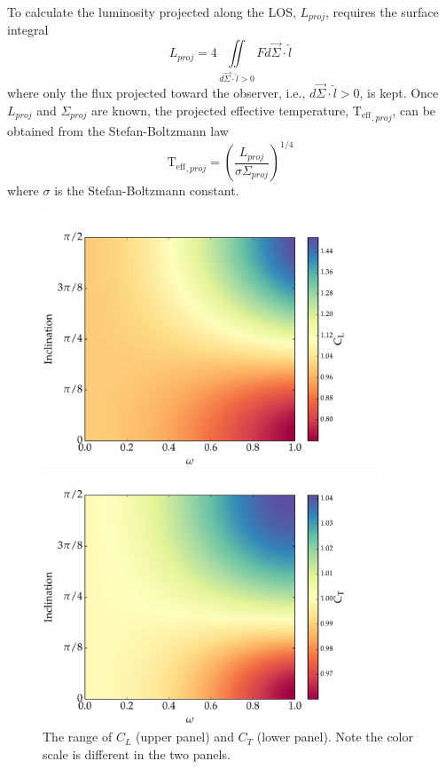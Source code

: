 \documentclass[12pt]{article}
\newcommand{\Teff}{\mathrm{T_{eff}}}
\begin{document}
To calculate the luminosity projected along the LOS, $L_{proj}$, requires the
surface integral
\begin{equation}\label{eq:lproj}
  L_{proj} = 4 \iint \limits_{d\vec{\Sigma} \cdot \hat{l} > 0} F d\vec{\Sigma} \cdot \hat{l}
\end{equation}
where only the flux projected toward the observer,
i.e., $d\vec{\Sigma} \cdot \hat{l} > 0$, is kept.
Once $L_{proj}$ and $\Sigma_{proj}$ are known, the projected effective temperature,
$\Teff_{,proj}$, can be obtained from the Stefan-Boltzmann law
\begin{equation}
\Teff_{,proj} = \left( \frac{L_{proj}}{\sigma \Sigma_{proj}} \right)^{1/4}
\end{equation}
where $\sigma$ is the Stefan-Boltzmann constant.

\begin{figure}
  \centering
  \includegraphics[width=0.9\textwidth]{../plots/C_L.pdf}
  
  \includegraphics[width=0.9\textwidth]{../plots/C_T.pdf}
  
  \caption{The range of $C_L$ (upper panel) and $C_T$ (lower panel). Note the
    color scale is different in the two panels. \label{fig:coeff}}
\end{figure}
\end{document}
